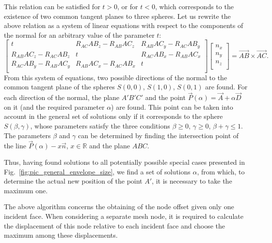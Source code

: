 \documentclass[
11pt,
tightenlines,
twoside,
onecolumn,
nofloats,
nobibnotes,
nofootinbib,
superscriptaddress,
noshowpacs,
centertags]
{revtex4-2}
\begin{document}
This relation can be satisfied for $t > 0$, or for  $t < 0$, which
corresponds to the existence of two common tangent planes to three
spheres.
Let us rewrite the above relation as a system  of linear equations
with respect to the components of the normal for an arbitrary value
of the parameter $t$:
\begin{equation}
\left[ { \begin{array}{ccc}
             t & R_{AC} AB_z - R_{AB} AC_z & R_{AB} AC_y - R_{AC} AB_y \\
             R_{AB} AC_z - R_{AC} AB_z & t & R_{AC} AB_x - R_{AB} AC_x \\
             R_{AC} AB_y - R_{AB} AC_y & R_{AB} AC_x - R_{AC} AB_x & t \\
         \end{array} } \right]
\left[ { \begin{array}{c}
            n_x \\
            n_y \\
            n_z \\
         \end{array} } \right]
= \vec{AB} \times \vec{AC}.
\end{equation}
From this system of equations, two possible directions of the normal
to the common tangent plane of the spheres $S(0,0)$, $S(1,0)$, $S(0,
1)$ are found.
For each direction of the normal, the plane $A'B'C'$ and the point $\vec{P}(\alpha) = \vec{A} + \alpha \vec{D}$ on it (and the required parameter $\alpha$) are found.
This point can be taken into account in the general set of solutions only if it corresponds to the sphere $S(\beta, \gamma)$, whose parameters satisfy the three conditions $\beta \ge 0$, $\gamma \ge 0$, $ \beta + \gamma \le 1$.
The parameters $\beta$ and $\gamma$ can be determined by finding the intersection point of the line $\vec{P}(\alpha) - x \vec{n}$, $x \in \mathbb{R}$ and the plane $ABC$.

Thus, having found solutions to all potentially possible special
cases presented in Fig.~\ref{fig:pic_general_envelope_size}, we find
a set of solutions $\alpha$, from which, to determine the actual new
position of the point $A'$, it is necessary to take the maximum one.

The above algorithm concerns the obtaining of the node offset given only one incident face.
When considering a separate mesh node, it is required to calculate the displacement of this node relative to each incident face and choose the maximum among these displacements.
\end{document}
